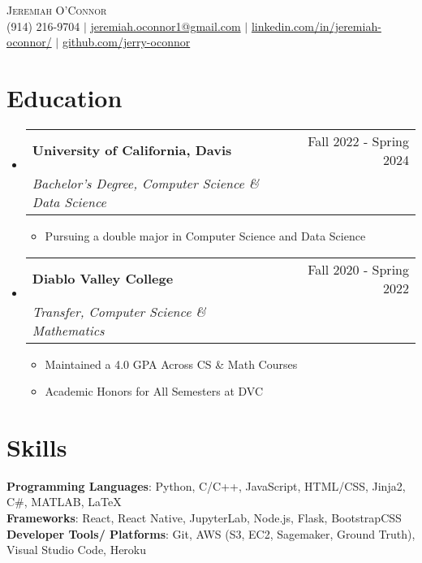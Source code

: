 \documentclass[letterpaper, 11pt]{article}
\makeatletter
\newcommand{\resumeItem}[1]{
  \item\small{
    {#1 \vspace{-2pt}}
  }
}
\newcommand{\resumeSubheading}[4]{
  \vspace{-2pt}\item
    \begin{tabular*}{0.97\textwidth}[t]{l@{\extracolsep{\fill}}r}
      \textbf{#1} & #2 \\
      \textit{\small#3} & \textit{\small #4} \\
    \end{tabular*}\vspace{-7pt}
}
\newcommand{\resumeSubHeadingListStart}{\begin{itemize}[leftmargin=0.15in, label={}]}
\newcommand{\resumeSubHeadingListEnd}{\end{itemize}}
\newcommand{\resumeItemListStart}{\begin{itemize}}
\newcommand{\resumeItemListEnd}{\end{itemize}\vspace{-5pt}}
\makeatother
\begin{document}

\begin{center}
  \Huge {\scshape Jeremiah O'Connor} \\ \vspace{7pt}
  \vspace{5mm}
  \small \faPhone* (914) 216-9704 $ | $
  \href{mailto:jeremiah.oconnor1@gmail.com}{{\faMailBulk \hspace{1pt} jeremiah.oconnor1@gmail.com}} $ | $
  \href{https://www.linkedin.com/in/jeremiah-oconnor/}{{\faLinkedin \hspace{1pt} linkedin.com/in/jeremiah-oconnor/}} $ | $
  \href{https://github.com/jerry-oconnor}{{\faGithub \hspace{1pt} github.com/jerry-oconnor}}
\end{center}

\section{Education}
\resumeSubHeadingListStart

\resumeSubheading
{University of California, Davis}{Fall 2022 - Spring 2024}
{Bachelor's Degree, Computer Science \& Data Science}{}
\resumeItemListStart
\resumeItem{Pursuing a double major in Computer Science and Data Science}
\resumeItemListEnd
\resumeSubheading
{Diablo Valley College}{Fall 2020 - Spring 2022}
{Transfer, Computer Science \& Mathematics}{}
\resumeItemListStart
\resumeItem{Maintained a 4.0 GPA Across CS \& Math Courses}
\resumeItem{Academic Honors for All Semesters at DVC}
\resumeItemListEnd

\resumeSubHeadingListEnd

\section{Skills}
\begin{itemize}[leftmargin=0.15in, label={}]
  \small{\item{
                \textbf{Programming Languages}{: Python, C/C++, JavaScript, HTML/CSS, Jinja2, C\#, MATLAB, LaTeX} \\
                \textbf{Frameworks}{: React, React Native, JupyterLab, Node.js, Flask, BootstrapCSS} \\
                \textbf{Developer Tools/ Platforms}{: Git, AWS (S3, EC2, Sagemaker, Ground Truth), Visual Studio Code, Heroku} \\
          }}
\end{itemize}
\end{document}
